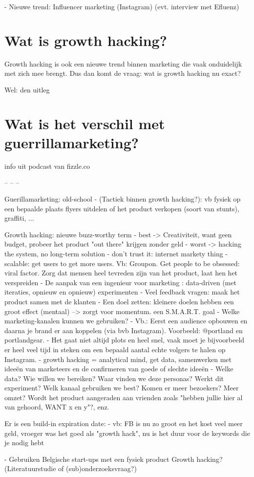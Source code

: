 - Nieuwe trend: Influencer marketing (Instagram) (evt. interview met Efluenz)

\section{Wat is growth hacking?}
\label{sec:wat-is-growth-hacking}
Growth hacking is ook een nieuwe trend binnen marketing die vaak onduidelijk met zich mee brengt. Dus dan komt de vraag: wat is growth hacking nu exact?

Wel: den uitleg

\section{Wat is het verschil met guerrillamarketing?}
\label{sec:verschil-met-guerrillamarketing}

info uit podcast van fizzle.co

 -- -- -- 

Guerillamarketing: old-school
- (Tactiek binnen growth hacking?): vb fysiek op een bepaalde plaats flyers uitdelen of het product verkopen (soort van stunts), graffiti, ...

Growth hacking: nieuwe buzz-worthy term
- best -> Creativiteit, want geen budget, probeer het product "out there" krijgen zonder geld
- worst -> hacking the system, no long-term solution
- don't trust it: internet markety thing
- scalable: get users to get more users. Vb: Groupon. Get people to be obsessed: viral factor. Zorg dat mensen heel tevreden zijn van het product, laat hen het verspreiden
- De aanpak van een ingenieur voor marketing : data-driven (met iteraties, opnieuw en opnieuw) experimenten
- Veel feedback vragen: maak het product samen met de klanten
- Een doel zetten: kleinere doelen hebben een groot effect (mentaal) --> zorgt voor momentum. een S.M.A.R.T. goal
- Welke marketing-kanalen kunnen we gebruiken?
- Vb.: Eerst een audience opbouwen en daarna je brand er aan koppelen (via bvb Instagram). Voorbeeld: @portland en portlandgear.
- Het gaat niet altijd plots en heel snel, vaak moet je bijvoorbeeld er heel veel tijd in steken om een bepaald aantal echte volgers te halen op Instagram. 
- growth hacking = analytical mind, get data, samenwerken met ideeën van marketeers en de confirmeren van goede of slechte ideeën
- Welke data? Wie willen we bereiken? Waar vinden we deze personas? Werkt dit experiment? Welk kanaal gebruiken we best? Komen er meer bezoekers? Meer omzet? Wordt het product aangeraden aan vrienden zoals "hebben jullie hier al van gehoord, WANT x en y"?, enz.


Er is een build-in expiration date:
- vb: FB is nu zo groot en het kost veel meer geld, vroeger was het goed als "growth hack", nu is het duur voor de keywords die je nodig hebt



- Gebruiken Belgische start-ups met een fysiek product Growth hacking? (Literatuurstudie of (sub)onderzoeksvraag?)

